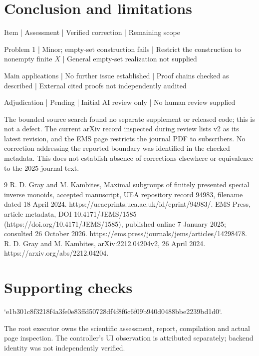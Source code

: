 \documentclass[10pt]{article}
\begin{document}
\section*{Conclusion and limitations}
Item | Assessment | Verified correction | Remaining scope\par
Problem 1 | Minor; empty-set construction fails | Restrict the construction to nonempty finite \(X\) | General empty-set realization not supplied\par
Main applications | No further issue established | Proof chains checked as described | External cited proofs not independently audited\par
Adjudication | Pending | Initial AI review only | No human review supplied\par
The bounded source search found no separate supplement or released code; this is not a defect. The current arXiv record inspected during review lists v2 as its latest revision, and the EMS page restricts the journal PDF to subscribers. No correction addressing the reported boundary was identified in the checked metadata. This does not establish absence of corrections elsewhere or equivalence to the 2025 journal text.\par
9 R. D. Gray and M. Kambites, Maximal subgroups of finitely presented special inverse monoids, accepted manuscript, UEA repository record 94983, filename dated 18 April 2024. https://ueaeprints.uea.ac.uk/id/eprint/94983/. EMS Press, article metadata, DOI 10.4171/JEMS/1585 (https://doi.org/10.4171/JEMS/1585), published online 7 January 2025; consulted 26 October 2026. https://ems.press/journals/jems/articles/14298478. R. D. Gray and M. Kambites, arXiv:2212.04204v2, 26 April 2024. https://arxiv.org/abs/2212.04204.\par
\section*{Supporting checks}
`e1b301c8f3218f4a3fe0e83ffd50728df4f8f6c6f09b940d0488bbe2239bd1d0`.\par
The root executor owns the scientific assessment, report, compilation and actual page inspection. The controller’s UI observation is attributed separately; backend identity was not independently verified.\par
\end{document}
